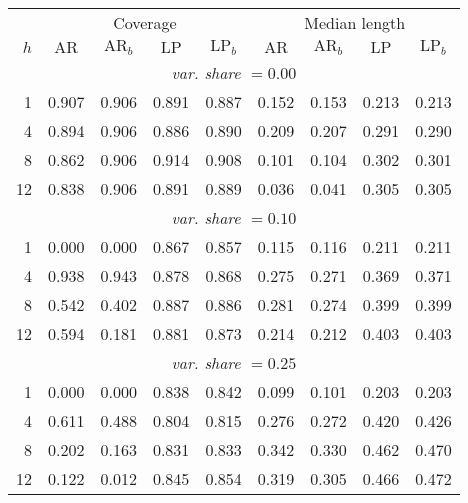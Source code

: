 \begin{tabular}{r|cccc|cccc}
& \multicolumn{4}{c|}{Coverage} & \multicolumn{4}{c}{Median length} \\
$h$ & $\text{AR}$ & $\text{AR}_b$ & $\text{LP}$ & $\text{LP}_b$ & $\text{AR}$ & $\text{AR}_b$ & $\text{LP}$ & $\text{LP}_b$ \\
\hline
\multicolumn{9}{c}{\emph{var. share $= 0.00$}} \\
  1 & 0.907 & 0.906 & 0.891 & 0.887 & 0.152 & 0.153 & 0.213 & 0.213 \\
  4 & 0.894 & 0.906 & 0.886 & 0.890 & 0.209 & 0.207 & 0.291 & 0.290 \\
  8 & 0.862 & 0.906 & 0.914 & 0.908 & 0.101 & 0.104 & 0.302 & 0.301 \\
 12 & 0.838 & 0.906 & 0.891 & 0.889 & 0.036 & 0.041 & 0.305 & 0.305 \\
\multicolumn{9}{c}{\emph{var. share $= 0.10$}} \\
  1 & 0.000 & 0.000 & 0.867 & 0.857 & 0.115 & 0.116 & 0.211 & 0.211 \\
  4 & 0.938 & 0.943 & 0.878 & 0.868 & 0.275 & 0.271 & 0.369 & 0.371 \\
  8 & 0.542 & 0.402 & 0.887 & 0.886 & 0.281 & 0.274 & 0.399 & 0.399 \\
 12 & 0.594 & 0.181 & 0.881 & 0.873 & 0.214 & 0.212 & 0.403 & 0.403 \\
\multicolumn{9}{c}{\emph{var. share $= 0.25$}} \\
  1 & 0.000 & 0.000 & 0.838 & 0.842 & 0.099 & 0.101 & 0.203 & 0.203 \\
  4 & 0.611 & 0.488 & 0.804 & 0.815 & 0.276 & 0.272 & 0.420 & 0.426 \\
  8 & 0.202 & 0.163 & 0.831 & 0.833 & 0.342 & 0.330 & 0.462 & 0.470 \\
 12 & 0.122 & 0.012 & 0.845 & 0.854 & 0.319 & 0.305 & 0.466 & 0.472 \\
\end{tabular}